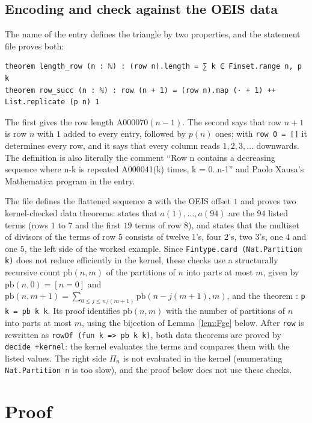 \documentclass[11pt]{amsart}
\theoremstyle{plain}
\theoremstyle{definition}
\begin{document}
\subsection*{Encoding and check against the OEIS data}
The name of the entry defines the triangle by two properties, and the statement file proves both:
\begin{lstlisting}
theorem length_row (n : ℕ) : (row n).length = ∑ k ∈ Finset.range n, p k
theorem row_succ (n : ℕ) : row (n + 1) = (row n).map (· + 1) ++ List.replicate (p n) 1
\end{lstlisting}
The first gives the row length A000070$(n-1)$. The second says that row $n+1$ is row $n$ with $1$ added to every entry, followed by $p(n)$ ones; with \texttt{row 0 = []} it determines every row, and it says that every column reads $1,2,3,\dots$ downwards.
The definition is also literally the comment ``Row n contains a decreasing sequence where n-k is repeated A000041(k) times, k = 0..n-1'' and Paolo Xausa's Mathematica program in the entry.

The file defines the flattened sequence \texttt{a} with the OEIS offset $1$ and proves two kernel-checked data theorems:  states that $a(1),\dots,a(94)$ are the $94$ listed terms (rows $1$ to $7$ and the first $19$ terms of row $8$), and  states that the multiset of divisors of the terms of row $5$ consists of twelve $1$'s, four $2$'s, two $3$'s, one $4$ and one $5$, the left side of the worked example.
Since \texttt{Fintype.card (Nat.Partition k)} does not reduce efficiently in the kernel, these checks use a structurally recursive count $\mathrm{pb}(n,m)$ of the partitions of $n$ into parts at most $m$, given by $\mathrm{pb}(n,0)=[n=0]$ and $\mathrm{pb}(n,m+1)=\sum_{0\le j\le n/(m+1)}\mathrm{pb}(n-j(m+1),m)$, and the theorem : \texttt{p k = pb k k}.
Its proof identifies $\mathrm{pb}(n,m)$ with the number of partitions of $n$ into parts at most $m$, using the bijection  of Lemma~\ref{lem:Fge} below.
After \texttt{row} is rewritten as \texttt{rowOf (fun k => pb k k)}, both data theorems are proved by \texttt{decide +kernel}: the kernel evaluates the terms and compares them with the listed values.
The right side $\Pi_n$ is not evaluated in the kernel (enumerating \texttt{Nat.Partition n} is too slow), and the proof below does not use these checks.

\section{Proof}\label{sec:proof}
\end{document}
